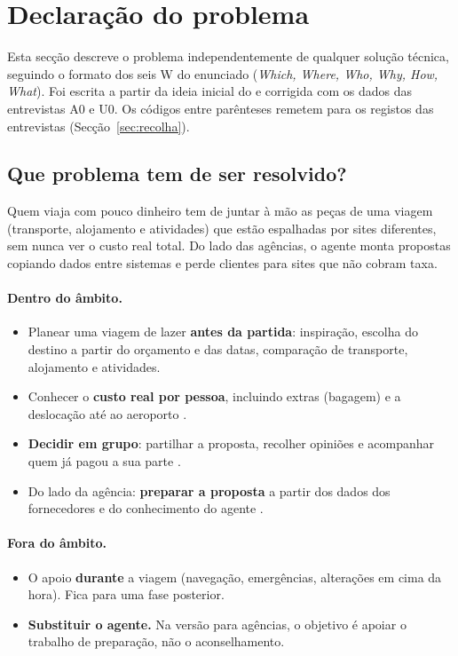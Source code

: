 \section{Declaração do problema}\label{sec:problema}

Esta secção descreve o problema independentemente de qualquer solução técnica, seguindo o formato dos seis 
W do enunciado (\textit{Which, Where, Who, Why, How, What}). Foi escrita a partir da ideia inicial do \projeto{} 
e corrigida com os dados das entrevistas A0 e U0. Os códigos entre parênteses remetem para os registos das entrevistas (Secção~\ref{sec:recolha}).

\subsection{Que problema tem de ser resolvido?}

Quem viaja com pouco dinheiro tem de juntar à mão as peças de uma viagem (transporte, alojamento e atividades) que estão 
espalhadas por sites diferentes, sem nunca ver o custo real total. Do 
lado das agências, o agente monta propostas copiando dados entre sistemas e perde clientes para sites que não cobram taxa.

\paragraph{Dentro do âmbito.}
\begin{itemize}
  \item Planear uma viagem de lazer \textbf{antes da partida}: inspiração, escolha do destino a partir do orçamento e das datas, comparação de transporte, alojamento e atividades.
  \item Conhecer o \textbf{custo real por pessoa}, incluindo extras (bagagem) e a deslocação até ao aeroporto .
  \item \textbf{Decidir em grupo}: partilhar a proposta, recolher opiniões e acompanhar quem já pagou a sua parte .
  \item Do lado da agência: \textbf{preparar a proposta} a partir dos dados dos fornecedores e do conhecimento do agente .
\end{itemize}

\paragraph{Fora do âmbito.}
\begin{itemize}
  \item O apoio \textbf{durante} a viagem (navegação, emergências, alterações em cima da hora). Fica para uma fase posterior.
  \item \textbf{Substituir o agente.} Na versão para agências, o objetivo é apoiar o trabalho de preparação, não o aconselhamento.
\end{itemize}

